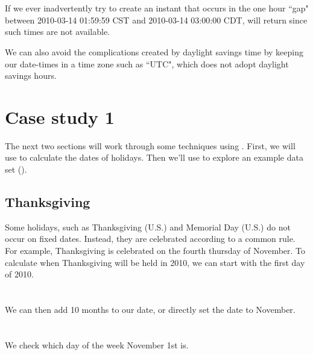 \documentclass[article]{jss}
\begin{document}
\\
\\

If we ever inadvertently try to create an instant that occurs in the one hour ``gap" between 2010-03-14 01:59:59 CST  and 2010-03-14 03:00:00 CDT,  will return  since such times are not available.

We can also avoid the complications created by daylight savings time by keeping our date-times in a time zone such as ``UTC", which does not adopt daylight savings hours.

\section{Case study 1}

The next two sections will work through some techniques using . First, we will use  to calculate the dates of  holidays. Then we'll use  to explore an example data set ().

\subsection{Thanksgiving}
Some holidays, such as Thanksgiving (U.S.) and Memorial Day (U.S.) do not occur on fixed dates. Instead, they are celebrated according to a common rule. For example, Thanksgiving is celebrated on the fourth thursday of November. To calculate when Thanksgiving will be held in 2010, we can start with the first day of 2010.\\

\\
\\

We can then add 10 months to our date, or directly set the date to November.\\

\\
\\

We check which day of the week November 1st is.\\

\\
\\
\end{document}
